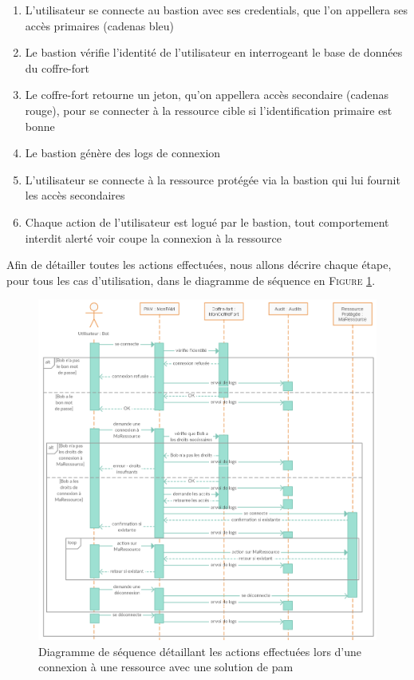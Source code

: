 \begin{enumerate}
	\item L'utilisateur se connecte au bastion avec ses \glspl{credential}, que l'on appellera ses accès primaires (cadenas bleu)
	\item Le bastion vérifie l'identité de l'utilisateur en interrogeant le base de données du coffre-fort
	\item Le coffre-fort retourne un jeton, qu'on appellera accès secondaire (cadenas rouge), pour se connecter à la ressource cible si l'identification primaire est bonne
	\item Le bastion génère des logs de connexion
	\item L'utilisateur se connecte à la ressource protégée via la bastion qui lui fournit les accès secondaires
	\item Chaque action de l'utilisateur est logué par le bastion, tout comportement interdit alerté voir coupe la connexion à la ressource
\end{enumerate}

Afin de détailler toutes les actions effectuées, nous allons décrire chaque étape, pour tous les cas d'utilisation, dans le diagramme de séquence en \textsc{Figure} \ref{fig:diagseq_PAM}.

\begin{figure}[!ht]
    \center
    \includegraphics[width=1.2\textwidth]{./images/Sequence_PAM_use.png}
    \caption{Diagramme de séquence détaillant les actions effectuées lors d'une connexion à une ressource avec une solution de \gls{pam}}
    \label{fig:diagseq_PAM}
\end{figure}



